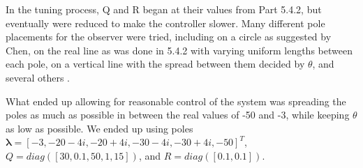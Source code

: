In the tuning process, Q and R began at their values from Part 5.4.2, but eventually were reduced to make the controller slower. Many different pole placements for the observer were tried, including on a circle as suggested by Chen, on the real line as was done in 5.4.2 with varying uniform lengths between each pole, on a vertical line with the spread between them decided by $\theta$, and several others \cite[p.290]{chen14}.

What ended up allowing for reasonable control of the system was spreading the poles as much as possible in between the real values of -50 and -3, while keeping $\theta$ as low as possible.  We ended up using poles $\bm{\lambda} = [-3, -20-4i, -20+4i, -30-4i, -30+4i, -50]^T$, $Q = diag([30, 0.1, 50, 1, 15])$, and $R = diag([0.1, 0.1])$.

